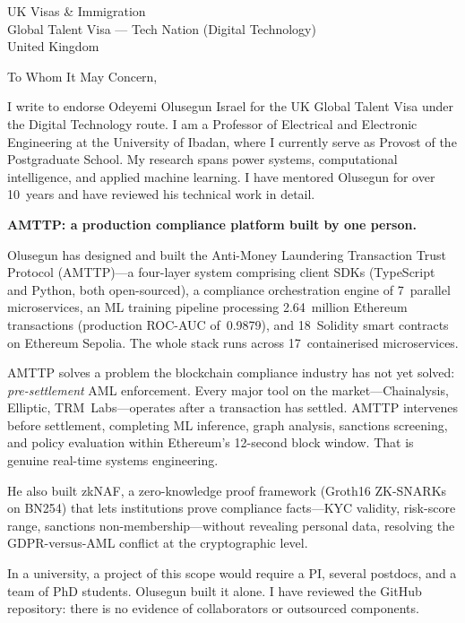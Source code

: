 \documentclass[12pt,a4paper]{letter}
\date{27 February 2026}
\begin{document}
\begin{letter}{UK Visas \& Immigration\\
Global Talent Visa --- Tech Nation (Digital Technology)\\
United Kingdom}

\opening{To Whom It May Concern,}

I write to endorse Odeyemi Olusegun Israel for the UK Global Talent Visa
under the Digital Technology route.  I am a Professor of Electrical and
Electronic Engineering at the University of Ibadan, where I currently
serve as Provost of the Postgraduate School.  My research spans power
systems, computational intelligence, and applied machine learning.  I
have mentored Olusegun for over 10~years and have reviewed his technical
work in detail.


\textbf{AMTTP: a production compliance platform built by one person.}

Olusegun has designed and built the Anti-Money Laundering Transaction
Trust Protocol (AMTTP)---a four-layer system comprising client SDKs
(TypeScript and Python, both open-sourced), a compliance orchestration
engine of 7~parallel microservices, an ML training pipeline processing
2.64~million Ethereum transactions (production ROC-AUC of~0.9879), and
18~Solidity smart contracts on Ethereum Sepolia.  The whole stack runs
across 17~containerised microservices.

AMTTP solves a problem the blockchain compliance industry has not yet
solved: \textit{pre-settlement} AML enforcement.  Every major tool on
the market---Chainalysis, Elliptic, TRM~Labs---operates after a
transaction has settled.  AMTTP intervenes before settlement, completing
ML inference, graph analysis, sanctions screening, and policy evaluation
within Ethereum's 12-second block window.  That is genuine real-time
systems engineering.

He also built zkNAF, a zero-knowledge proof framework (Groth16
ZK-SNARKs on BN254) that lets institutions prove compliance
facts---KYC validity, risk-score range, sanctions
non-membership---without revealing personal data, resolving the
GDPR-versus-AML conflict at the cryptographic level.

In a university, a project of this scope would require a PI, several
postdocs, and a team of PhD students.  Olusegun built it alone.  I have
reviewed the GitHub repository: there is no evidence of collaborators or
outsourced components.


\end{letter}
\end{document}
